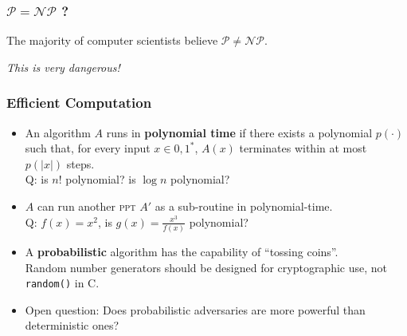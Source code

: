 \begin{frame}\frametitle{$\mathcal{P} = \mathcal{NP}$ ?}
\begin{figure}
\begin{center}

\end{center}
\end{figure}
\centerline{The majority of computer scientists believe $\mathcal{P} \ne \mathcal{NP}$.}
\centerline{\alert{\emph{This is very dangerous!}}} 
\end{frame}
\begin{frame}[fragile]\frametitle{Efficient Computation}
\begin{itemize}
\item An algorithm $A$ runs in \textbf{polynomial time} if there exists a polynomial $p(\cdot)$ such that,
 for every input $x \in {0,1}^*$, $A(x)$ terminates within at most $p(|x|)$ steps. \\
 \alert{Q: is $n!$ polynomial? is $\log n$ polynomial?}
\item $A$ can run another \textsc{ppt} $A'$ as a sub-routine in polynomial-time.\\
 \alert{Q: $f(x) = x^{2} $, is $g(x) =  \frac{x^{3}}{f(x)}$ polynomial?}
\item A \textbf{probabilistic} algorithm has the capability of ``tossing coins''.\\
Random number generators should be designed for cryptographic use, not \verb|random()| in C. 
\item Open question: Does probabilistic adversaries are more powerful than deterministic ones? 
\end{itemize}
\end{frame}
